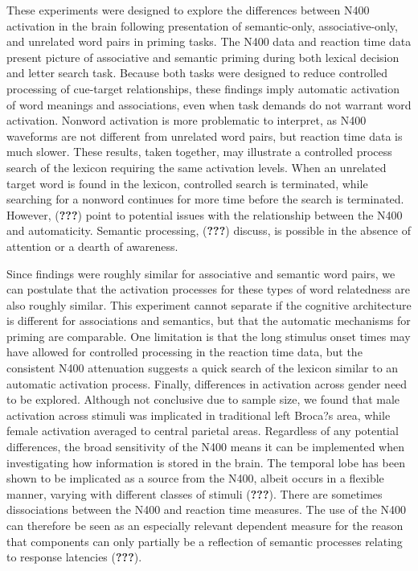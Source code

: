 \documentclass[english,man]{apa6}
\theoremstyle{definition}
\theoremstyle{definition}
\theoremstyle{definition}
\theoremstyle{remark}
\begin{document}
These experiments were designed to explore the differences between N400
activation in the brain following presentation of semantic-only,
associative-only, and unrelated word pairs in priming tasks. The N400
data and reaction time data present picture of associative and semantic
priming during both lexical decision and letter search task. Because
both tasks were designed to reduce controlled processing of cue-target
relationships, these findings imply automatic activation of word
meanings and associations, even when task demands do not warrant word
activation. Nonword activation is more problematic to interpret, as N400
waveforms are not different from unrelated word pairs, but reaction time
data is much slower. These results, taken together, may illustrate a
controlled process search of the lexicon requiring the same activation
levels. When an unrelated target word is found in the lexicon,
controlled search is terminated, while searching for a nonword continues
for more time before the search is terminated. However, ({\textbf{???}})
point to potential issues with the relationship between the N400 and
automaticity. Semantic processing, ({\textbf{???}}) discuss, is possible
in the absence of attention or a dearth of awareness.

Since findings were roughly similar for associative and semantic word
pairs, we can postulate that the activation processes for these types of
word relatedness are also roughly similar. This experiment cannot
separate if the cognitive architecture is different for associations and
semantics, but that the automatic mechanisms for priming are comparable.
One limitation is that the long stimulus onset times may have allowed
for controlled processing in the reaction time data, but the consistent
N400 attenuation suggests a quick search of the lexicon similar to an
automatic activation process. Finally, differences in activation across
gender need to be explored. Although not conclusive due to sample size,
we found that male activation across stimuli was implicated in
traditional left Broca?s area, while female activation averaged to
central parietal areas. Regardless of any potential differences, the
broad sensitivity of the N400 means it can be implemented when
investigating how information is stored in the brain. The temporal lobe
has been shown to be implicated as a source from the N400, albeit occurs
in a flexible manner, varying with different classes of stimuli
({\textbf{???}}). There are sometimes dissociations between the N400 and
reaction time measures. The use of the N400 can therefore be seen as an
especially relevant dependent measure for the reason that components can
only partially be a reflection of semantic processes relating to
response latencies ({\textbf{???}}).
\end{document}
